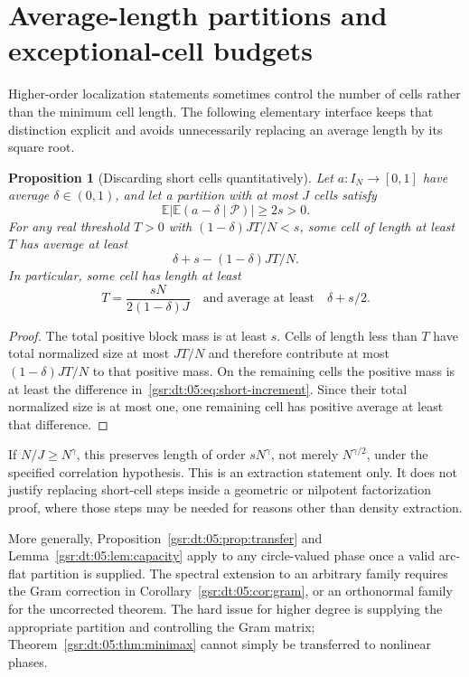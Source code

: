 \documentclass[11pt,letterpaper]{article}
\numberwithin{equation}{section}
\newtheorem{proposition}[theorem]{Proposition}
\theoremstyle{definition}
\theoremstyle{remark}
\newcommand{\E}{\mathbb E}
\newcommand{\1}{\mathbf 1}
\newcommand{\srctag}[1]{\texorpdfstring{\enspace\textup{[#1]}}{ [#1]}}
\newcommand{\srcnote}[2]{\par\noindent{\small\textit{Source #1, delivered #2.}}\par}
\begin{document}
\section[{Average-length partitions and exceptional-cell budgets\srctag{05}}]{Average-length partitions and exceptional-cell budgets}\label{gsr:dt:05:sec:d6}
\srcnote{05}{Section 6}
\label{gsr:dt:05:sec:exceptions}
Higher-order localization statements sometimes control the number of cells rather than the minimum cell length. The following elementary interface keeps that distinction explicit and avoids unnecessarily replacing an average length by its square root.

\begin{proposition}[Discarding short cells quantitatively]
\label{gsr:dt:05:prop:short}
Let $a:I_N\to[0,1]$ have average $\delta\in(0,1)$, and let a partition with at most $J$ cells satisfy
\[
 \E\left|\E(a-\delta\mid\mathcal P)\right|\geq2s>0.
\]
For any real threshold $T>0$ with $(1-\delta)JT/N<s$, some cell of length at least $T$ has average at least
\begin{equation}
 \delta+s-(1-\delta)JT/N.
 \label{gsr:dt:05:eq:short-increment}
\end{equation}
In particular, some cell has length at least
\begin{equation}
 T=\frac{sN}{2(1-\delta)J}
 \quad\text{and average at least}\quad \delta+s/2.
 \label{gsr:dt:05:eq:short-choice}
\end{equation}
\end{proposition}
\begin{proof}
The total positive block mass is at least $s$. Cells of length less than $T$ have total normalized size at most $JT/N$ and therefore contribute at most $(1-\delta)JT/N$ to that positive mass. On the remaining cells the positive mass is at least the difference in~\eqref{gsr:dt:05:eq:short-increment}. Since their total normalized size is at most one, one remaining cell has positive average at least that difference.
\end{proof}

If $N/J\geq N^\gamma$, this preserves length of order $sN^\gamma$, not merely $N^{\gamma/2}$, under the specified correlation hypothesis. This is an extraction statement only. It does not justify replacing short-cell steps inside a geometric or nilpotent factorization proof, where those steps may be needed for reasons other than density extraction.

More generally, Proposition~\ref{gsr:dt:05:prop:transfer} and Lemma~\ref{gsr:dt:05:lem:capacity} apply to any circle-valued phase once a valid arc-flat partition is supplied. The spectral extension to an arbitrary family requires the Gram correction in Corollary~\ref{gsr:dt:05:cor:gram}, or an orthonormal family for the uncorrected theorem. The hard issue for higher degree is supplying the appropriate partition and controlling the Gram matrix; Theorem~\ref{gsr:dt:05:thm:minimax} cannot simply be transferred to nonlinear phases.
\end{document}
